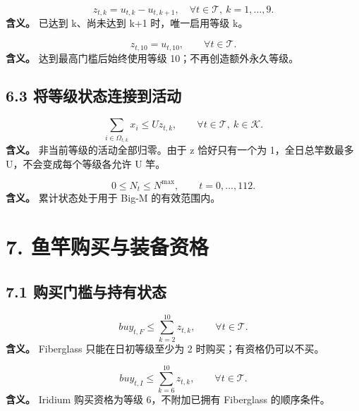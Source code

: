 \documentclass[11pt,a4paper]{article}
\begin{document}
\begin{samepage}
\[
z_{t,k}=u_{t,k}-u_{t,k+1},
\quad \forall t\in\mathcal T,\ k=1,\ldots,9. \tag{C11}
\]
\textbf{含义。} 已达到 k、尚未达到 k+1 时，唯一启用等级 k。\par
\end{samepage}

\begin{samepage}
\[
z_{t,10}=u_{t,10},\qquad \forall t\in\mathcal T. \tag{C12}
\]
\textbf{含义。} 达到最高门槛后始终使用等级 10；不再创造额外永久等级。\par
\end{samepage}

\subsection*{6.3 将等级状态连接到活动}

\begin{samepage}
\[
\sum_{i\in\Omega_{t,k}}x_i\le Uz_{t,k},
\qquad \forall t\in\mathcal T,\ k\in\mathcal K. \tag{C13}
\]
\textbf{含义。} 非当前等级的活动全部归零。由于 z 恰好只有一个为 1，全日总竿数最多 U，不会变成每个等级各允许 U 竿。\par
\end{samepage}

\begin{samepage}
\[
0\le N_t\le N^{\max},\qquad t=0,\ldots,112. \tag{C14}
\]
\textbf{含义。} 累计状态处于用于 Big-M 的有效范围内。\par
\end{samepage}

\section*{\color{modelblue}7. 鱼竿购买与装备资格}

\subsection*{7.1 购买门槛与持有状态}

\begin{samepage}
\[
buy_{t,F}\le\sum_{k=2}^{10}z_{t,k},\qquad \forall t\in\mathcal T. \tag{C15}
\]
\textbf{含义。} Fiberglass 只能在日初等级至少为 2 时购买；有资格仍可以不买。\par
\end{samepage}

\begin{samepage}
\[
buy_{t,I}\le\sum_{k=6}^{10}z_{t,k},\qquad \forall t\in\mathcal T. \tag{C16}
\]
\textbf{含义。} Iridium 购买资格为等级 6，不附加已拥有 Fiberglass 的顺序条件。\par
\end{samepage}
\end{document}
